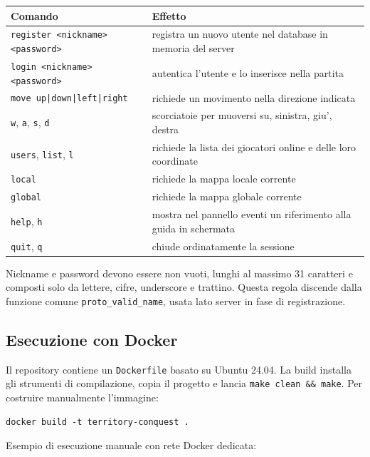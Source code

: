 \documentclass[11pt,a4paper]{article}
\begin{document}
\begin{center}
\begin{tabular}{p{} p{}}
\toprule
\textbf{Comando} & \textbf{Effetto} \\
\midrule
\texttt{register <nickname> <password>} & registra un nuovo utente nel database in memoria del server \\
\texttt{login <nickname> <password>} & autentica l'utente e lo inserisce nella partita \\
\texttt{move up|down|left|right} & richiede un movimento nella direzione indicata \\
\texttt{w}, \texttt{a}, \texttt{s}, \texttt{d} & scorciatoie per muoversi su, sinistra, giu', destra \\
\texttt{users}, \texttt{list}, \texttt{l} & richiede la lista dei giocatori online e delle loro coordinate \\
\texttt{local} & richiede la mappa locale corrente \\
\texttt{global} & richiede la mappa globale corrente \\
\texttt{help}, \texttt{h} & mostra nel pannello eventi un riferimento alla guida in schermata \\
\texttt{quit}, \texttt{q} & chiude ordinatamente la sessione \\
\bottomrule
\end{tabular}
\end{center}

Nickname e password devono essere non vuoti, lunghi al massimo 31 caratteri e
composti solo da lettere, cifre, underscore e trattino. Questa regola discende
dalla funzione comune \texttt{proto\_valid\_name}, usata lato server in fase di
registrazione.

\subsection{Esecuzione con Docker}

Il repository contiene un \texttt{Dockerfile} basato su Ubuntu 24.04. La build
installa gli strumenti di compilazione, copia il progetto e lancia
\texttt{make clean \&\& make}. Per costruire manualmente l'immagine:

\begin{lstlisting}[style=textstyle]
docker build -t territory-conquest .
\end{lstlisting}

Esempio di esecuzione manuale con rete Docker dedicata:
\end{document}
